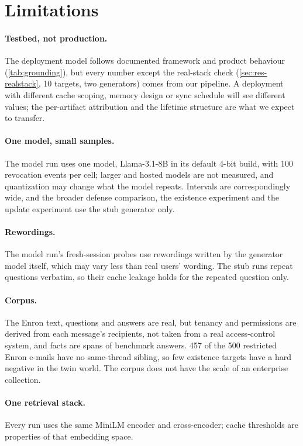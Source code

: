 \section{Limitations}
\label{sec:limits}

\paragraph{Testbed, not production.}
The deployment model follows documented framework and product behaviour (\cref{tab:grounding}), but
every number except the real-stack check (\cref{sec:res-realstack}, 10 targets, two generators) comes from
our pipeline. A deployment with different cache scoping, memory design or sync schedule will see
different values; the per-artifact attribution and the lifetime structure are what we expect to
transfer.

\paragraph{One model, small samples.}
The model run uses one model, Llama-3.1-8B in its default 4-bit build, with 100 revocation events per
cell; larger and hosted models are not measured, and quantization may change what the model repeats.
Intervals are correspondingly wide, and the broader defense comparison, the existence experiment and
the update experiment use the stub generator only.

\paragraph{Rewordings.}
The model run's fresh-session probes use rewordings written by the generator model itself, which may
vary less than real users' wording. The stub runs repeat questions verbatim, so their cache leakage
holds for the repeated question only.

\paragraph{Corpus.}
The Enron text, questions and answers are real, but tenancy and permissions are derived from each
message's recipients, not taken from a real access-control system, and facts are spans of benchmark
answers. 457 of the 500 restricted Enron e-mails have no same-thread sibling, so few existence targets
have a hard negative in the twin world. The corpus does not have the scale of an enterprise
collection.

\paragraph{One retrieval stack.}
Every run uses the same MiniLM encoder and cross-encoder; cache thresholds are properties of that
embedding space.

